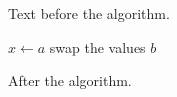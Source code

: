 \documentclass{article}
\begin{document}
Text before the algorithm.

\begin{algorithm}[h]
\caption{Euclid's algorithm}\label{alg:euclid}
\begin{algorithmic}[1]
\STATE $x \gets a$
\STATE swap the values
\ELSE
\RETURN $b$
\ENDIF
\end{algorithmic}
\end{algorithm}

After the algorithm.
\end{document}
